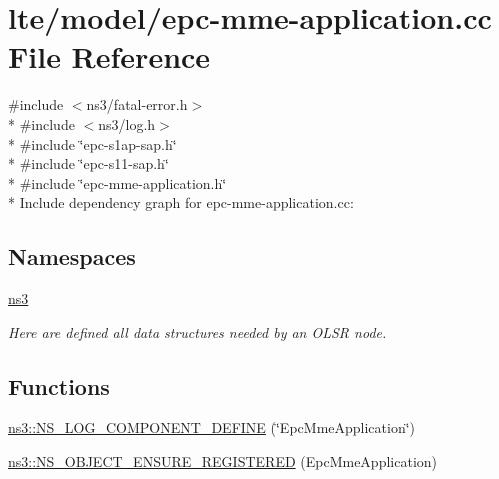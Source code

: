 \hypertarget{epc-mme-application_8cc}{}\section{lte/model/epc-\/mme-\/application.cc File Reference}
\label{epc-mme-application_8cc}
{\ttfamily \#include $<$ns3/fatal-\/error.\+h$>$}\\*
{\ttfamily \#include $<$ns3/log.\+h$>$}\\*
{\ttfamily \#include \char`\"{}epc-\/s1ap-\/sap.\+h\char`\"{}}\\*
{\ttfamily \#include \char`\"{}epc-\/s11-\/sap.\+h\char`\"{}}\\*
{\ttfamily \#include \char`\"{}epc-\/mme-\/application.\+h\char`\"{}}\\*
Include dependency graph for epc-\/mme-\/application.cc\+:
\subsection*{Namespaces}
\begin{DoxyCompactItemize}
\item 
 \hyperlink{namespacens3}{ns3}
\begin{DoxyCompactList}\small\item\em Here are defined all data structures needed by an O\+L\+SR node. \end{DoxyCompactList}\end{DoxyCompactItemize}
\subsection*{Functions}
\begin{DoxyCompactItemize}
\item 
\hyperlink{namespacens3_ac3ae9b3aa80c9982bc2ee4265c9d3a72}{ns3\+::\+N\+S\+\_\+\+L\+O\+G\+\_\+\+C\+O\+M\+P\+O\+N\+E\+N\+T\+\_\+\+D\+E\+F\+I\+NE} (\char`\"{}Epc\+Mme\+Application\char`\"{})
\item 
\hyperlink{namespacens3_a2a7f500f7cf8ac9a84abc890cff160e5}{ns3\+::\+N\+S\+\_\+\+O\+B\+J\+E\+C\+T\+\_\+\+E\+N\+S\+U\+R\+E\+\_\+\+R\+E\+G\+I\+S\+T\+E\+R\+ED} (Epc\+Mme\+Application)
\end{DoxyCompactItemize}
